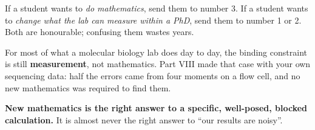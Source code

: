 \begin{plain}[breakable=false]
If a student wants to \emph{do mathematics}, send them to number 3. If a student wants to
\emph{change what the lab can measure within a PhD}, send them to number 1 or 2. Both are honourable;
confusing them wastes years.
\end{plain}

\begin{critbox}[title={And the caution I keep repeating, because it keeps being true}]
For most of what a molecular biology lab does day to day, the binding constraint is still
\textbf{measurement}, not mathematics. Part VIII made that case with your own sequencing data: half
the errors came from four moments on a flow cell, and no new mathematics was required to find them.

\textbf{New mathematics is the right answer to a specific, well-posed, blocked calculation.} It is
almost never the right answer to ``our results are noisy''.
\end{critbox}
